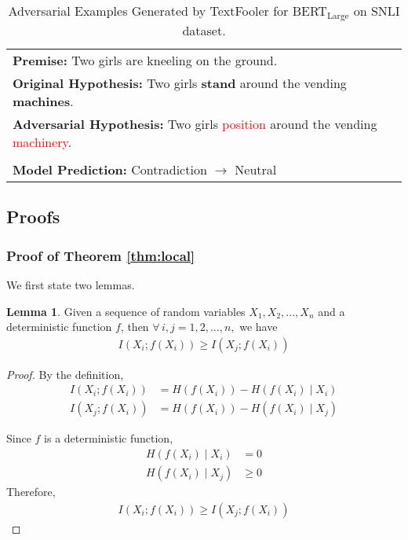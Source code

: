 \documentclass{article} \usepackage{iclr2021_conference,times}
\theoremstyle{definition}
\newtheorem{lemma}[theorem]{Lemma}
\theoremstyle{remark}
\begin{document}
\begin{table}[htp!]
\begin{tabular}{p{13.8cm}}
\textbf{Premise:} Two girls are kneeling on the ground. \\
\textbf{Original Hypothesis: } Two girls \textbf{stand} around the vending \textbf{machines}.\\
\textbf{Adversarial Hypothesis: } Two girls \textcolor{red}{position} around the vending \textcolor{red}{machinery}. \\
\\
\textbf{Model Prediction: } Contradiction $\rightarrow$ Neutral \\
\bottomrule
\end{tabular}
\caption{Adversarial Examples Generated by TextFooler for BERT$_\text{Large}$ on SNLI dataset.}
\label{tab:ablation_eg}
\end{table}




\clearpage
\subsection{Proofs}
\subsubsection{Proof of Theorem \ref{thm:local}}
We first state two lemmas.
\begin{lemma}\label{lem:mi}
Given a sequence of random variables $X_1, X_2, ..., X_n$ and a deterministic function $f$, then $\forall \, i, j = 1, 2, ..., n,$ we have 
\begin{align}
    I(X_i; f(X_i)) \ge I(X_j; f(X_i))
\end{align}
\end{lemma}
\begin{proof}
By the definition,
\begin{align}
    I(X_i; f(X_i)) &= H(f(X_i)) - H(f(X_i) \mid X_i) \\
    I(X_j; f(X_i)) &= H(f(X_i)) - H(f(X_i) \mid X_j) 
\end{align}

Since $f$ is a deterministic function, 
\begin{align}
     H(f(X_i) \mid X_i) &= 0 \\
     H(f(X_i) \mid X_j) &\ge 0 
\end{align}
Therefore, 
\begin{align}
    I(X_i; f(X_i)) \ge I(X_j; f(X_i))
\end{align}
\end{proof}
\end{document}
